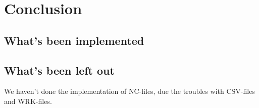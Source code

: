 \chapter{Conclusion}
\section{What's been implemented}

\section{What's been left out}
We haven't done the implementation of NC-files, due the troubles with CSV-files and WRK-files.